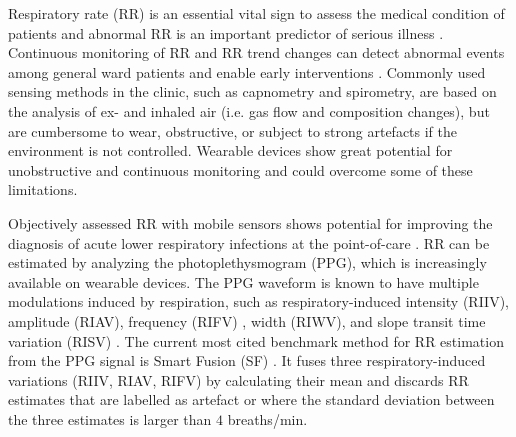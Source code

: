 \documentclass[letterpaper, 10 pt, conference]{ieeeconf}
\begin{document}
Respiratory rate (RR) is an essential vital sign to assess the medical condition of patients and abnormal RR is an important predictor of serious illness \cite{Jayaraman2008}. Continuous monitoring of RR and RR trend changes can detect abnormal events among general ward patients and enable early interventions \cite{Mok2015}. %
Commonly used sensing methods in the clinic, such as capnometry and spirometry, are based on the analysis of ex- and inhaled air (i.e. gas flow and composition changes), but are cumbersome to wear, obstructive, or subject to strong artefacts if the environment is not controlled. Wearable devices show great potential for unobstructive and continuous monitoring and could overcome some of these limitations.

Objectively assessed RR with mobile sensors shows potential for improving the diagnosis of acute lower respiratory infections at the point-of-care \cite{Karlen2014}. RR can be estimated by analyzing the photoplethysmogram (PPG), which is increasingly available on wearable devices. The PPG waveform is known to have multiple modulations induced by respiration, such as respiratory-induced intensity (RIIV), amplitude (RIAV), frequency (RIFV) \cite{Karlen2013c}, width (RIWV)\cite{Lazaro2013b}, and slope transit time variation (RISV) \cite{Addison2016c}. The current most cited benchmark method for RR estimation from the PPG signal is Smart Fusion (SF) \cite{Karlen2013c}. It fuses three respiratory-induced variations (RIIV, RIAV, RIFV) by calculating their mean and discards RR estimates that are labelled as artefact or where the standard deviation between the three estimates is larger than $4$ breaths/min.
\end{document}
